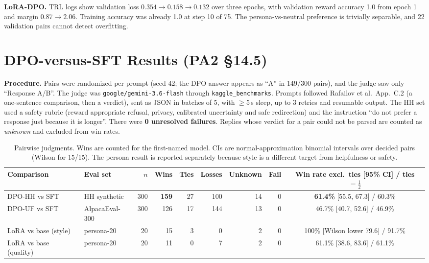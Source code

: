 \documentclass[10pt,a4paper]{article}
\begin{document}
\textbf{LoRA-DPO.} TRL logs show validation loss $0.354\to0.158\to0.132$ over three epochs, with validation reward accuracy 1.0 from epoch 1 and margin $0.87\to2.06$. Training accuracy was already 1.0 at step 10 of 75. The persona-vs-neutral preference is trivially separable, and 22 validation pairs cannot detect overfitting.

\section{DPO-versus-SFT Results (PA2 \S14.5)}
\textbf{Procedure.} Pairs were randomized per prompt (seed 42; the DPO answer appears as ``A'' in 149/300 pairs), and the judge saw only ``Response A/B''. The judge was \texttt{google/gemini-3.6-flash} through \texttt{kaggle\_benchmarks}. Prompts followed Rafailov et al.\ App.~C.2 (a one-sentence comparison, then a verdict), sent as JSON in batches of 5, with $\ge$5\,s sleep, up to 3 retries and resumable output. The HH set used a safety rubric (reward appropriate refusal, privacy, calibrated uncertainty and safe redirection) and the instruction ``do not prefer a response just because it is longer''. There were \textbf{0 unresolved failures}. Replies whose verdict for a pair could not be parsed are counted as \emph{unknown} and excluded from win rates.

\begin{table}[h]
\centering\footnotesize
\begin{tabular}{@{}llrrrrrrc@{}}
\toprule
Comparison & Eval set & $n$ & Wins & Ties & Losses & Unknown & Fail & Win rate excl.\ ties [95\% CI] / ties $=\tfrac12$ \\
\midrule
DPO-HH vs SFT & HH synthetic & 300 & \textbf{159} & 27 & 100 & 14 & 0 & \textbf{61.4\%} [55.5, 67.3] / 60.3\% \\
DPO-UF vs SFT & AlpacaEval-300 & 300 & 126 & 17 & 144 & 13 & 0 & 46.7\% [40.7, 52.6] / 46.9\% \\
\midrule
LoRA vs base (style) & persona-20 & 20 & 15 & 3 & 0 & 2 & 0 & 100\% [Wilson lower 79.6] / 91.7\% \\
LoRA vs base (quality) & persona-20 & 20 & 11 & 0 & 7 & 2 & 0 & 61.1\% [38.6, 83.6] / 61.1\% \\
\bottomrule
\end{tabular}
\caption{Pairwise judgments. Wins are counted for the first-named model. CIs are normal-approximation binomial intervals over decided pairs (Wilson for 15/15). The persona result is reported separately because style is a different target from helpfulness or safety.}
\label{tab:results}
\end{table}
\end{document}
